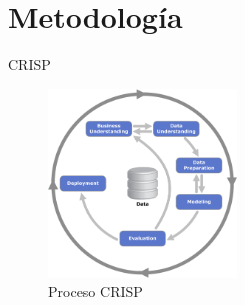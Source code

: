 \documentclass[11pt]{beamer}
\begin{document}
\section{Metodología}
\begin{frame}{CRISP}
\begin{figure}
\centering
	\includegraphics[height=5cm]{crisp}
	\caption{Proceso CRISP}	
\end{figure}
\end{frame}
\end{document}
